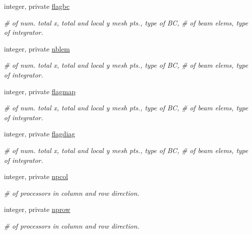 \begin{DoxyCompactItemize}
integer, private \mbox{\hyperlink{namespaceaccsimulatorclass_a1ba011ab9980a00689505f8cbbd05732}{flagbc}}
\begin{DoxyCompactList}\small\item\em \# of num. total x, total and local y mesh pts., type of BC, \# of beam elems, type of integrator. \end{DoxyCompactList}\item 
integer, private \mbox{\hyperlink{namespaceaccsimulatorclass_a99e7feb0e1e3adf9ad845a7425a1b9f7}{nblem}}
\begin{DoxyCompactList}\small\item\em \# of num. total x, total and local y mesh pts., type of BC, \# of beam elems, type of integrator. \end{DoxyCompactList}\item 
integer, private \mbox{\hyperlink{namespaceaccsimulatorclass_aeb76c7474e39b4748e1f18d5c44b63ce}{flagmap}}
\begin{DoxyCompactList}\small\item\em \# of num. total x, total and local y mesh pts., type of BC, \# of beam elems, type of integrator. \end{DoxyCompactList}\item 
integer, private \mbox{\hyperlink{namespaceaccsimulatorclass_af61313c9e48dba34ab064f69f8d43183}{flagdiag}}
\begin{DoxyCompactList}\small\item\em \# of num. total x, total and local y mesh pts., type of BC, \# of beam elems, type of integrator. \end{DoxyCompactList}\end{DoxyCompactItemize}

\textbf{ }\par
\begin{DoxyCompactItemize}
\item 
integer, private \mbox{\hyperlink{namespaceaccsimulatorclass_ac427142c8239a7c9d4d571de0516f6d0}{npcol}}
\begin{DoxyCompactList}\small\item\em \# of processors in column and row direction. \end{DoxyCompactList}\item 
integer, private \mbox{\hyperlink{namespaceaccsimulatorclass_ae4ec48c98f1d184540a67f262b362b9c}{nprow}}
\begin{DoxyCompactList}\small\item\em \# of processors in column and row direction. \end{DoxyCompactList}\end{DoxyCompactItemize}

